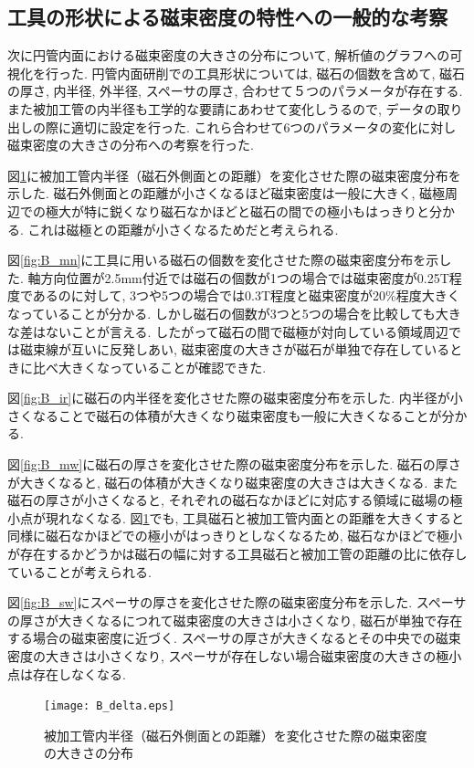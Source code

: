 \documentclass[11pt]{jarticle}
\begin{document}
  \subsection{工具の形状による磁束密度の特性への一般的な考察}
次に円管内面における磁束密度の大きさの分布について, 解析値のグラフへの可視化を行った. 円管内面研削での工具形状については, 磁石の個数を含めて, 磁石の厚さ, 内半径, 外半径, スペーサの厚さ, 合わせて５つのパラメータが存在する. また被加工管の内半径も工学的な要請にあわせて変化しうるので, データの取り出しの際に適切に設定を行った. これら合わせて6つのパラメータの変化に対し磁束密度の大きさの分布への考察を行った. \par
図\ref{fig:B_delta}に被加工管内半径（磁石外側面との距離）を変化させた際の磁束密度分布を示した. 磁石外側面との距離が小さくなるほど磁束密度は一般に大きく, 磁極周辺での極大が特に鋭くなり磁石なかほどと磁石の間での極小もはっきりと分かる. これは磁極との距離が小さくなるためだと考えられる. \par
図\ref{fig:B_mn}に工具に用いる磁石の個数を変化させた際の磁束密度分布を示した. 軸方向位置が2.5mm付近では磁石の個数が1つの場合では磁束密度が0.25T程度であるのに対して, 3つや5つの場合では0.3T程度と磁束密度が20\%程度大きくなっていることが分かる. しかし磁石の個数が3つと5つの場合を比較しても大きな差はないことが言える. したがって磁石の間で磁極が対向している領域周辺では磁束線が互いに反発しあい, 磁束密度の大きさが磁石が単独で存在しているときに比べ大きくなっていることが確認できた. \par
図\ref{fig:B_ir}に磁石の内半径を変化させた際の磁束密度分布を示した. 内半径が小さくなることで磁石の体積が大きくなり磁束密度も一般に大きくなることが分かる. \par
図\ref{fig:B_mw}に磁石の厚さを変化させた際の磁束密度分布を示した. 磁石の厚さが大きくなると, 磁石の体積が大きくなり磁束密度の大きさは大きくなる. また磁石の厚さが小さくなると, それぞれの磁石なかほどに対応する領域に磁場の極小点が現れなくなる. 図\ref{fig:B_delta}でも, 工具磁石と被加工管内面との距離を大きくすると同様に磁石なかほどでの極小がはっきりとしなくなるため, 磁石なかほどで極小が存在するかどうかは磁石の幅に対する工具磁石と被加工管の距離の比に依存していることが考えられる. \par
図\ref{fig:B_sw}にスペーサの厚さを変化させた際の磁束密度分布を示した. スペーサの厚さが大きくなるにつれて磁束密度の大きさは小さくなり, 磁石が単独で存在する場合の磁束密度に近づく. スペーサの厚さが大きくなるとその中央での磁束密度の大きさは小さくなり, スペーサが存在しない場合磁束密度の大きさの極小点は存在しなくなる. 

  \begin{figure}[H]
    \begin{center}
      \texttt{[image: B\_delta.eps]}
    \end{center}
    \caption{被加工管内半径（磁石外側面との距離）を変化させた際の磁束密度の大きさの分布}
    \label{fig:B_delta}
  \end{figure}
\end{document}
